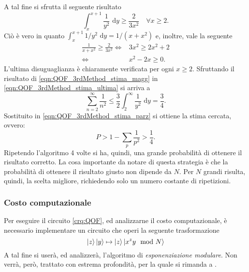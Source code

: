 A tal fine si sfrutta il seguente risultato
\begin{equation}\label{eqn:QOF_3rdMethod_stima_magg}
 \int_{x}^{x+1} \frac{1}{y^2} \text{ d}y \geq \frac{2}{3x^2} \quad \forall x \geq 2.
\end{equation}
Ciò è vero in quanto $\int_{x}^{x+1} 1/y^2 \text{ d}y = 1/(x+x^2)$ e, inoltre, vale la seguente
\begin{align}
 \frac{1}{x+x^2} \geq \frac{2}{3x^2} \iff& 3x^2 \geq 2x^2 + 2\\
 \iff& x^2 - 2x \geq 0.
\end{align}
L'ultima disuguaglianza è chiaramente verificata per ogni $x \geq 2$.
Sfruttando il risultato di \eqref{eqn:QOF_3rdMethod_stima_magg} in \eqref{eqn:QOF_3rdMethod_stima_ultima} si arriva a
\begin{equation}
 \sum_{n=2}^\infty \frac{1}{n^2} \leq \frac{3}{2}\int_{2}^{\infty} \frac{1}{y^2} \text{ d}y = \frac{3}{4}.
\end{equation}
Sostituito in \eqref{eqn:QOF_3rdMethod_stima_parz} si ottiene la stima cercata, ovvero:
\begin{equation}
 P > 1 - \sum_{p} \frac{1}{p^2} > \frac{1}{4}.
\end{equation}
Ripetendo l'algoritmo 4 volte si ha, quindi, una grande probabilità di ottenere il risultato corretto.
La cosa importante da notare di questa strategia è che la probabilità di ottenere il risultato giusto non dipende da $N$.
Per $N$ grandi risulta, quindi, la scelta migliore, richiedendo solo un numero costante di ripetizioni.

\subsubsection{Costo computazionale}
Per eseguire il circuito \ref{crq:QOF}, ed analizzarne il costo computazionale, è necessario implementare un circuito che operi la seguente trasformazione
\begin{equation}
 \ket{z}\ket{y} \mapsto \ket{z}\ket{x^zy \mod N}
\end{equation}
A tal fine si userà, ed analizzerà, l'algoritmo di \textit{esponenziazione modulare}. 
Non verrà, però, trattato con estrema profondità, per la quale si rimanda a \cite{Article:Shor:1997}.

